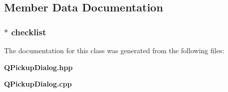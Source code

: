 \subsection{Member Data Documentation}
\subsubsection{$\ast$ {\bf checklist}\hspace{0.3cm}{\tt  [protected]}}\label{classQPickupDialog_p0}




The documentation for this class was generated from the following files:\begin{CompactItemize}
\item 
{\bf QPickup\-Dialog.hpp}\item 
{\bf QPickup\-Dialog.cpp}\end{CompactItemize}
